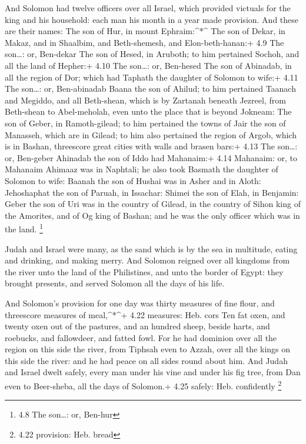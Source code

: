  And Solomon had twelve officers over all Israel, which
provided victuals for the king and his household: each man his month in
a year made provision.  And these are their names: The son
of Hur, in mount Ephraim:\^{}*\^{}  The son of Dekar, in
Makaz, and in Shaalbim, and Beth-shemesh, and Elon-beth-hanan:+ 4.9 The
son\ldots: or, Ben-dekar  The son of Hesed, in Aruboth; to
him pertained Sochoh, and all the land of Hepher:+ 4.10 The son\ldots:
or, Ben-hesed  The son of Abinadab, in all the region of
Dor; which had Taphath the daughter of Solomon to wife:+ 4.11 The
son\ldots: or, Ben-abinadab  Baana the son of Ahilud; to
him pertained Taanach and Megiddo, and all Beth-shean, which is by
Zartanah beneath Jezreel, from Beth-shean to Abel-meholah, even unto the
place that is beyond Jokneam:  The son of Geber, in
Ramoth-gilead; to him pertained the towns of Jair the son of Manasseh,
which are in Gilead; to him also pertained the region of Argob, which is
in Bashan, threescore great cities with walls and brasen bars:+ 4.13 The
son\ldots: or, Ben-geber  Ahinadab the son of Iddo had
Mahanaim:+ 4.14 Mahanaim: or, to Mahanaim  Ahimaaz was in
Naphtali; he also took Basmath the daughter of Solomon to wife:
 Baanah the son of Hushai was in Asher and in Aloth:
 Jehoshaphat the son of Paruah, in Issachar: 
Shimei the son of Elah, in Benjamin:  Geber the son of Uri
was in the country of Gilead, in the country of Sihon king of the
Amorites, and of Og king of Bashan; and he was the only officer which
was in the land. \footnote{4.8 The son\ldots: or, Ben-hur}

 Judah and Israel were many, as the sand which is by the
sea in multitude, eating and drinking, and making merry. 
And Solomon reigned over all kingdoms from the river unto the land of
the Philistines, and unto the border of Egypt: they brought presents,
and served Solomon all the days of his life.

 And Solomon's provision for one day was thirty measures of
fine flour, and threescore measures of meal,\^{}*\^{}+ 4.22 measures:
Heb. cors  Ten fat oxen, and twenty oxen out of the
pastures, and an hundred sheep, beside harts, and roebucks, and
fallowdeer, and fatted fowl.  For he had dominion over all
the region on this side the river, from Tiphsah even to Azzah, over all
the kings on this side the river: and he had peace on all sides round
about him.  And Judah and Israel dwelt safely, every man
under his vine and under his fig tree, from Dan even to Beer-sheba, all
the days of Solomon.+ 4.25 safely: Heb. confidently \footnote{4.22
  provision: Heb. bread}

